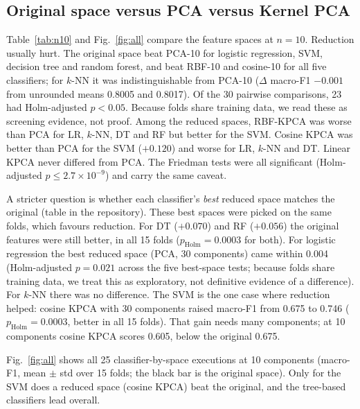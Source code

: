 \documentclass[runningheads]{llncs}
\begin{document}
\subsection{Original space versus PCA versus Kernel PCA}
Table~\ref{tab:n10} and Fig.~\ref{fig:all} compare the feature spaces at $n=10$. Reduction usually hurt. The original space beat PCA-10 for logistic regression, SVM, decision tree and random forest, and beat RBF-10 and cosine-10 for all five classifiers; for $k$-NN it was indistinguishable from PCA-10 ($\Delta$ macro-F1 $-0.001$ from unrounded means 0.8005 and 0.8017). Of the 30 pairwise comparisons, 23 had Holm-adjusted $p<0.05$. Because folds share training data, we read these as screening evidence, not proof. Among the reduced spaces, RBF-KPCA was worse than PCA for LR, $k$-NN, DT and RF but better for the SVM. Cosine KPCA was better than PCA for the SVM ($+0.120$) and worse for LR, $k$-NN and DT. Linear KPCA never differed from PCA. The Friedman tests were all significant (Holm-adjusted $p\le 2.7\times10^{-9}$) and carry the same caveat.

A stricter question is whether each classifier's \emph{best} reduced space matches the original (table in the repository). These best spaces were picked on the same folds, which favours reduction. For DT ($+0.070$) and RF ($+0.056$) the original features were still better, in all 15 folds ($p_\mathrm{Holm}=0.0003$ for both). For logistic regression the best reduced space (PCA, 30 components) came within 0.004 (Holm-adjusted $p=0.021$ across the five best-space tests; because folds share training data, we treat this as exploratory, not definitive evidence of a difference). For $k$-NN there was no difference. The SVM is the one case where reduction helped: cosine KPCA with 30 components raised macro-F1 from 0.675 to 0.746 ($p_\mathrm{Holm}=0.0003$, better in all 15 folds). That gain needs many components; at 10 components cosine KPCA scores 0.605, below the original 0.675.

\begin{table}[!htbp]
\caption{Mean accuracy and macro-F1 at 10 components (original = 78 features); macro-F1 as mean $\pm$ std over 15 folds.}\label{tab:n10}
\centering\scriptsize
{\setlength{\tabcolsep}{7pt}\resizebox{\textwidth}{!}{}}
\end{table}



Fig.~\ref{fig:all} shows all 25 classifier-by-space executions at 10 components (macro-F1, mean $\pm$ std over 15 folds; the black bar is the original space). Only for the SVM does a reduced space (cosine KPCA) beat the original, and the tree-based classifiers lead overall.
\end{document}
